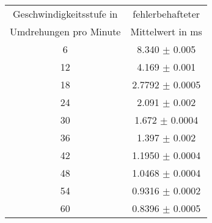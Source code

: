 \begin{center}
\begin{tabular}{c|c}
	Geschwindigkeitsstufe in & fehlerbehafteter \\
	Umdrehungen pro Minute & Mittelwert in ms\\
	\hline
	6 & 8.340 $\pm$ 0.005 \\
	12 & 4.169 $\pm$ 0.001 \\
	18 & 2.7792 $\pm$ 0.0005 \\
	24 & 2.091 $\pm$ 0.002 \\
	30 & 1.672 $\pm$ 0.0004 \\
	36 & 1.397 $\pm$ 0.002 \\
	42 & 1.1950 $\pm$ 0.0004 \\
	48 & 1.0468 $\pm$ 0.0004 \\
	54 & 0.9316 $\pm$ 0.0002 \\
	60 & 0.8396 $\pm$ 0.0005 \\
\end{tabular}
\end{center}